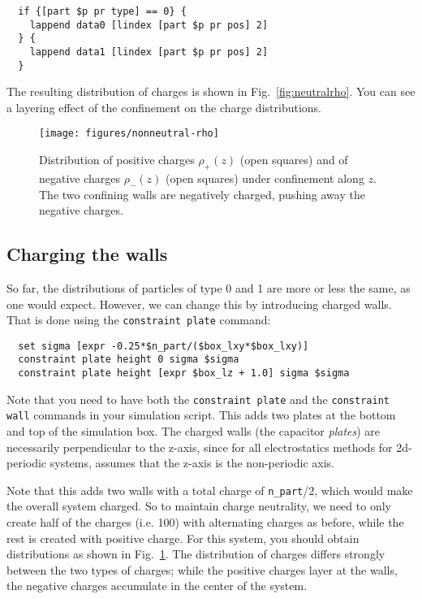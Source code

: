 \documentclass[
a4paper,                        %
11pt,                           %
twoside,                        %
footsepline,                    %
headsepline,                    %
headexclude,                    %
footexclude,                    %
pagesize,                       %
]{scrartcl}
\begin{document}
\begin{lstlisting}
  if {[part $p pr type] == 0} {
    lappend data0 [lindex [part $p pr pos] 2]
  } {
    lappend data1 [lindex [part $p pr pos] 2]
  }
\end{lstlisting}

The resulting distribution of charges is shown in
Fig.~\ref{fig:neutralrho}. You can see a layering effect of the
confinement on the charge distributions.

\begin{figure}[h]
  \centering
  \texttt{[image: figures/nonneutral-rho]}
  \caption{Distribution of positive charges $\rho_+(z)$ (open squares)
    and of negative charges $\rho_-(z)$ (open squares) under
    confinement along $z$. The two confining walls are negatively
    charged, pushing away the negative charges.}
  \label{fig:nonneutralrho}
\end{figure}

\subsection*{Charging the walls}

So far, the distributions of particles of type 0 and 1 are more or
less the same, as one would expect. However, we can change this by
introducing charged walls. That is done using the
\verb|constraint plate| command:

\begin{lstlisting}
  set sigma [expr -0.25*$n_part/($box_lxy*$box_lxy)]
  constraint plate height 0 sigma $sigma
  constraint plate height [expr $box_lz + 1.0] sigma $sigma
\end{lstlisting}

Note that you need to have both the \verb|constraint plate| and the 
\verb|constraint wall| commands in your simulation script.
This adds two plates at the bottom and top of the simulation box. The
charged walls (the capacitor \emph{plates}) are necessarily
perpendicular to the z-axis, since for all electrostatics methods for
2d-periodic systems, \es{} assumes that the z-axis is the
non-periodic axis.

Note that
this adds two walls with a total charge of \verb|n_part|/2, which
would make the overall system charged. So to maintain charge
neutrality, we need to only create half of the charges (i.e. 100)
with alternating charges as before, while the rest is created
with positive charge.
For this system, you should obtain distributions as shown in
Fig.~\ref{fig:nonneutralrho}. The distribution of charges differs
strongly between the two types of charges; while the positive charges
layer at the walls, the negative charges accumulate in the center of
the system.
\end{document}
